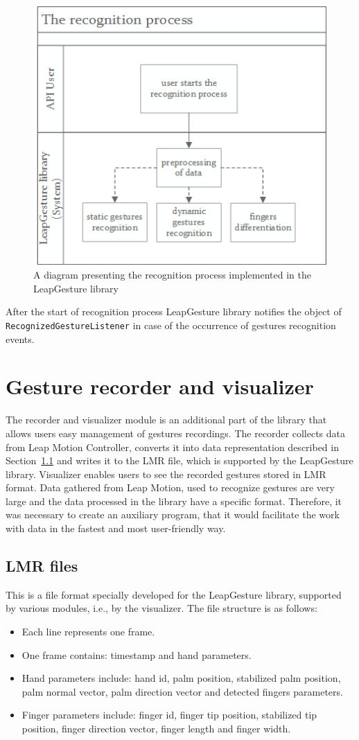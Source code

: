 \begin{figure}[htb]
\centering
 \includegraphics[width=0.6\columnwidth]{figures/recognitionProcess.png}
 \caption{A diagram presenting the recognition process implemented in the LeapGesture library}
 \label{recognitionprocess}
\end{figure}

After the start of recognition process LeapGesture library notifies the object of \texttt{RecognizedGestureListener} in case of the occurrence of gestures recognition events.

\section{Gesture recorder and visualizer}\label{recordvisualSection}
The recorder and visualizer module is an additional part of the library that allows users easy management of gestures recordings. The recorder collects data from Leap Motion Controller, converts it into data representation described in Section~\ref{} and writes it to the LMR file, which is supported by the LeapGesture library. Visualizer enables users to see the recorded gestures stored in LMR format. Data gathered from Leap Motion, used to recognize gestures are very large and the data processed in the library have a specific format. Therefore, it was necessary to create an auxiliary program, that it would facilitate the work with data in the fastest and most user-friendly way.

\subsection{LMR files}
This is a file format specially developed for the LeapGesture library, supported by various modules, i.e., by the visualizer. The file structure is as follows:
\begin{itemize}
\item Each line represents one frame.
\item One frame contains: timestamp and hand parameters.
\item Hand parameters include: hand id, palm position, stabilized palm position, palm normal vector, palm direction vector and detected fingers parameters.
\item Finger parameters include: finger id, finger tip position, stabilized tip position, finger direction vector, finger length and finger width.
\end{itemize}

